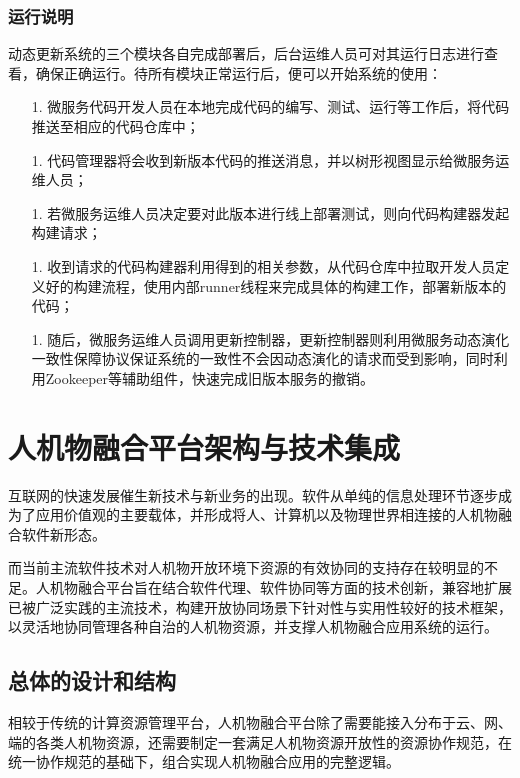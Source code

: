 \documentclass[a4paper]{article}
\theoremstyle{definition}
\begin{document}
\subsubsection{运行说明}

动态更新系统的三个模块各自完成部署后，后台运维人员可对其运行日志进行查看，确保正确运行。待所有模块正常运行后，便可以开始系统的使用：

\begin{enumerate}
	\item [1.] 微服务代码开发人员在本地完成代码的编写、测试、运行等工作后，将代码推送至相应的代码仓库中；
	\item [1.] 代码管理器将会收到新版本代码的推送消息，并以树形视图显示给微服务运维人员；
	\item [1.] 若微服务运维人员决定要对此版本进行线上部署测试，则向代码构建器发起构建请求；
	\item [1.] 收到请求的代码构建器利用得到的相关参数，从代码仓库中拉取开发人员定义好的构建流程，使用内部runner线程来完成具体的构建工作，部署新版本的代码；
	\item [1.] 随后，微服务运维人员调用更新控制器，更新控制器则利用微服务动态演化一致性保障协议保证系统的一致性不会因动态演化的请求而受到影响，同时利用Zookeeper等辅助组件，快速完成旧版本服务的撤销。
\end{enumerate}

\section{人机物融合平台架构与技术集成} 

互联网的快速发展催生新技术与新业务的出现。软件从单纯的信息处理环节逐步成为了应用价值观的主要载体，并形成将人、计算机以及物理世界相连接的人机物融合软件新形态。

而当前主流软件技术对人机物开放环境下资源的有效协同的支持存在较明显的不足。人机物融合平台旨在结合软件代理、软件协同等方面的技术创新，兼容地扩展已被广泛实践的主流技术，构建开放协同场景下针对性与实用性较好的技术框架，以灵活地协同管理各种自治的人机物资源，并支撑人机物融合应用系统的运行。

\subsection{总体的设计和结构}

相较于传统的计算资源管理平台，人机物融合平台除了需要能接入分布于云、网、端的各类人机物资源，还需要制定一套满足人机物资源开放性的资源协作规范，在统一协作规范的基础下，组合实现人机物融合应用的完整逻辑。
\end{document}
